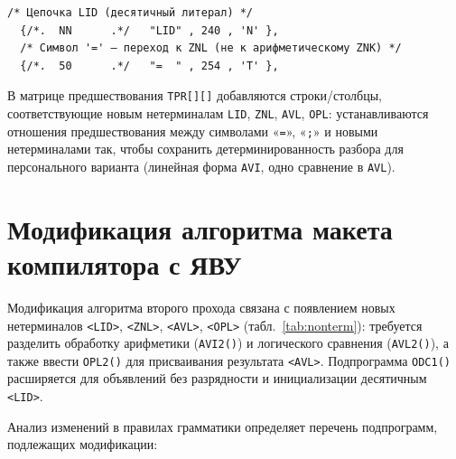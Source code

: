 \documentclass[a4paper,14pt]{extarticle}
\begin{document}
\begin{lstlisting}[style=Cstyle,caption={Фрагмент изменений в \texttt{VXOD[]}},label=lst:vxod4]
  /* Цепочка LID (десятичный литерал) */
  {/*.  NN      .*/   "LID" , 240 , 'N' },
  /* Символ '=' — переход к ZNL (не к арифметическому ZNK) */
  {/*.  50      .*/   "=  " , 254 , 'T' },
\end{lstlisting}

В матрице предшествования \texttt{TPR[][]} добавляются строки/столбцы, соответствующие новым нетерминалам \texttt{LID}, \texttt{ZNL},
\texttt{AVL}, \texttt{OPL}: устанавливаются отношения предшествования между символами «\texttt{=}», «\texttt{;}» и новыми
нетерминалами так, чтобы сохранить детерминированность разбора для персонального варианта (линейная форма \texttt{AVI}, одно сравнение
в \texttt{AVL}).

\section{Модификация алгоритма макета компилятора с ЯВУ}

Модификация алгоритма второго прохода связана с появлением новых нетерминалов \texttt{<LID>}, \texttt{<ZNL>},
\texttt{<AVL>}, \texttt{<OPL>} (табл.~\ref{tab:nonterm}): требуется разделить обработку арифметики (\texttt{AVI2()})
и логического сравнения (\texttt{AVL2()}), а также ввести \texttt{OPL2()} для присваивания результата \texttt{<AVL>}.
Подпрограмма \texttt{ODC1()} расширяется для объявлений без разрядности и инициализации десятичным \texttt{<LID>}.

Анализ изменений в правилах грамматики определяет перечень подпрограмм, подлежащих модификации:
\end{document}
